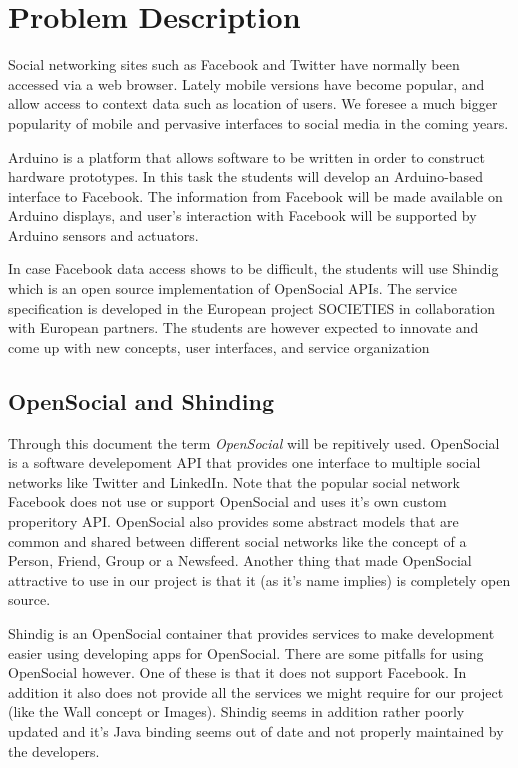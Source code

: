 \section{Problem Description}
Social networking sites such as Facebook and Twitter have normally been accessed  via a web browser. Lately mobile versions have become popular, and allow access to context data such as location of users. We foresee a much bigger popularity of mobile and pervasive interfaces to social media in the coming years. 

Arduino\cite{link:arduino} is a platform that allows software to be written in order to construct hardware 
prototypes. In this task the students will develop an Arduino-based interface to Facebook. The information from 
Facebook will be made available on Arduino displays, and user’s interaction with Facebook will be supported by 
Arduino sensors and actuators.

In case Facebook data access shows to be difficult, the students will use Shindig\cite{link:shinding} which 
is an open source implementation of OpenSocial APIs. The service specification is developed in the European project 
SOCIETIES in collaboration with European partners. The students are however expected to innovate and come up 
with new concepts, user interfaces, and service organization

\subsection{OpenSocial and Shinding}
Through this document the term {\em OpenSocial}\cite{link:opensocial} will be repitively used. OpenSocial is a software develepoment API that provides
one interface to multiple social networks like Twitter and LinkedIn. Note that the popular social network Facebook does not use
or support OpenSocial and uses it's own custom properitory API. OpenSocial also provides some abstract models that are common
and shared between different social networks like the concept of a Person, Friend, Group or a Newsfeed. Another thing that
made OpenSocial attractive to use in our project is that it (as it's name implies) is completely open source.

Shindig is an OpenSocial container that provides services to make development easier using developing apps for OpenSocial. There are some pitfalls
for using OpenSocial however. One of these is that it does not support Facebook. In addition it also does not provide all the services we might require
for our project (like the Wall concept or Images). Shindig seems in addition rather poorly updated and it's Java binding seems out of date and not properly
maintained by the developers.

